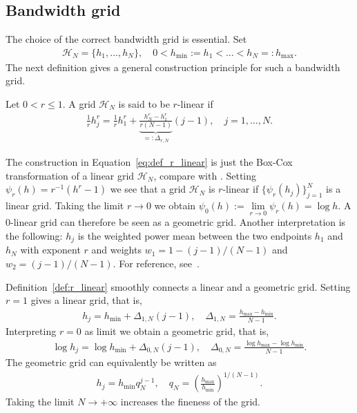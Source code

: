 \subsection{Bandwidth grid}

The choice of the correct bandwidth grid is essential. Set
\begin{align*}
    \mathcal{H}_N=\{h_1,\dots,h_N\},\quad0<h_{\min}:=h_1<\dots<h_N=:h_{\max}.
\end{align*}
The next definition gives a general construction principle for such a bandwidth grid.

\begin{Def}\label{def:r_linear}
    Let $0<r\le 1$. A grid $\mathcal{H}_N$ is said to be $r$-linear if
    \begin{align}\label{eq:def_r_linear}
        \frac{1}{r}h_j^r=\frac{1}{r}h_1^r+\underbrace{\frac{h_N^r-h_1^r}{r(N-1)}}_{=:\Delta_{r,N}}(j-1),\quad j=1,\dots,N.
    \end{align}
\end{Def}

\begin{Rem}
    The construction in Equation~\eqref{eq:def_r_linear} is just the Box-Cox transformation of a linear grid $\mathcal{H}_N$, compare with \cite[Equation (1)]{box_analysis_1964}. Setting $\psi_r(h)=r^{-1}(h^r-1)$ we see that a grid $\mathcal{H}_N$ is $r$-linear if $\{\psi_r(h_j)\}_{j=1}^{N}$ is a linear grid. Taking the limit $r\to0$ we obtain $\psi_0(h):=\lim\limits_{r\to0}\psi_{r}(h)=\log{h}$. A $0$-linear grid can therefore be seen as a geometric grid. Another interpretation is the following: $h_j$ is the weighted power mean between the two endpoints $h_1$ and $h_N$ with exponent $r$ and weights $w_1=1-(j-1)/(N-1)$ and $w_2=(j-1)/(N-1)$. For reference, see~\cite[Chapter~3.1]{bullen2013handbook}.
\end{Rem}

Definition~\ref{def:r_linear} smoothly connects a linear and a geometric grid. Setting $r=1$ gives a linear grid, that is,
\begin{align*}
    h_j=h_{\min}+\Delta_{1,N}(j-1),\quad\Delta_{1,N}=\frac{h_{\max}-h_{\min}}{N-1}.
\end{align*}
Interpreting $r=0$ as limit we obtain a geometric grid, that is,
\begin{align*}
    \log{h_j}=\log{h_{\min}}+\Delta_{0,N}(j-1),\quad\Delta_{0,N}=\frac{\log{h_{\max}}-\log{h_{\min}}}{N-1}.
\end{align*}
The geometric grid can equivalently be written as
\begin{align*}
    h_j=h_{\min}q_N^{j-1},\quad q_N=\left(\frac{h_{\max}}{h_{\min}}\right)^{1/(N-1)}.
\end{align*}
Taking the limit $N\to+\infty$ increases the fineness of the grid.

